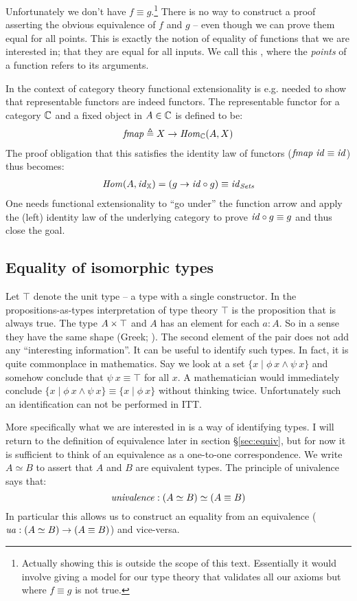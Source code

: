Unfortunately we don't have $f \equiv g$.\footnote{Actually showing this is
outside the scope of this text. Essentially it would involve giving a model
for our type theory that validates all our axioms but where $f \equiv g$ is
not true.} There is no way to construct a proof asserting the obvious
equivalence of $f$ and $g$ -- even though we can prove them equal for all
points. This is exactly the notion of equality of functions that we are
interested in; that they are equal for all inputs. We call this
, where the \emph{points} of a function refers
to its arguments.

In the context of category theory functional extensionality is e.g. needed to
show that representable functors are indeed functors. The representable functor
for a category $\mathbb{C}$ and a fixed object in $A \in \mathbb{C}$ is defined to be:
%
\begin{align*}
\fmap \defeq X \mto \Hom_{\bC}(A, X)
\end{align*}
%
The proof obligation that this satisfies the identity law of functors
($\fmap\ \idFun \equiv \idFun$) thus becomes:
%
\begin{align*}
\Hom(A, \idFun_{\bX}) = (g \mto \idFun \comp g) \equiv \idFun_{\Sets}
\end{align*}
%
One needs functional extensionality to ``go under'' the function arrow and apply
the (left) identity law of the underlying category to prove $\idFun \comp g
\equiv g$ and thus close the goal.
%
\subsection{Equality of isomorphic types}
%
Let $\top$ denote the unit type -- a type with a single constructor. In the
propositions-as-types interpretation of type theory $\top$ is the proposition
that is always true. The type $A \times \top$ and $A$ has an element for each $a :
A$. So in a sense they have the same shape (Greek; ). The
second element of the pair does not add any ``interesting information''. It can
be useful to identify such types. In fact, it is quite commonplace in
mathematics. Say we look at a set $\{x \mid \phi\ x \land \psi\ x\}$ and somehow
conclude that $\psi\ x \equiv \top$ for all $x$. A mathematician would
immediately conclude $\{x \mid \phi\ x \land \psi\ x\} \equiv \{x \mid
\phi\ x\}$ without thinking twice. Unfortunately such an identification can not
be performed in ITT.

More specifically what we are interested in is a way of identifying
 types. I will return to the definition of equivalence later
in section \S\ref{sec:equiv}, but for now it is sufficient to think of an
equivalence as a one-to-one correspondence. We write $A \simeq B$ to assert that
$A$ and $B$ are equivalent types. The principle of univalence says that:
%
$$\mathit{univalence} \mathrel{:} (A \simeq B) \simeq (A \equiv B)$$
%
In particular this allows us to construct an equality from an equivalence
($\mathit{ua} \mathrel{:} (A \simeq B) \to (A \equiv B)$) and vice-versa.

